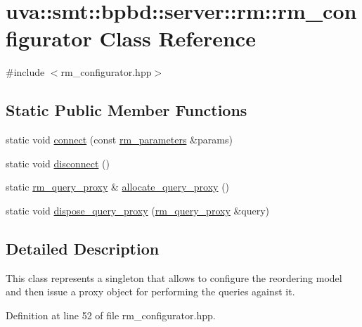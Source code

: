 \hypertarget{classuva_1_1smt_1_1bpbd_1_1server_1_1rm_1_1rm__configurator}{}\section{uva\+:\+:smt\+:\+:bpbd\+:\+:server\+:\+:rm\+:\+:rm\+\_\+configurator Class Reference}
\label{classuva_1_1smt_1_1bpbd_1_1server_1_1rm_1_1rm__configurator}


{\ttfamily \#include $<$rm\+\_\+configurator.\+hpp$>$}

\subsection*{Static Public Member Functions}
\begin{DoxyCompactItemize}
\item 
static void \hyperlink{classuva_1_1smt_1_1bpbd_1_1server_1_1rm_1_1rm__configurator_a3a84c4b261236e443aabf9a8b0f5f621}{connect} (const \hyperlink{structuva_1_1smt_1_1bpbd_1_1server_1_1rm_1_1rm__parameters}{rm\+\_\+parameters} \&params)
\item 
static void \hyperlink{classuva_1_1smt_1_1bpbd_1_1server_1_1rm_1_1rm__configurator_a9a79034392793abee6ed714d38f414cc}{disconnect} ()
\item 
static \hyperlink{classuva_1_1smt_1_1bpbd_1_1server_1_1rm_1_1proxy_1_1rm__query__proxy}{rm\+\_\+query\+\_\+proxy} \& \hyperlink{classuva_1_1smt_1_1bpbd_1_1server_1_1rm_1_1rm__configurator_a78c4e9f2e5b56104839a66ebc9058803}{allocate\+\_\+query\+\_\+proxy} ()
\item 
static void \hyperlink{classuva_1_1smt_1_1bpbd_1_1server_1_1rm_1_1rm__configurator_a74a43377bf78423d0271560b074b95fc}{dispose\+\_\+query\+\_\+proxy} (\hyperlink{classuva_1_1smt_1_1bpbd_1_1server_1_1rm_1_1proxy_1_1rm__query__proxy}{rm\+\_\+query\+\_\+proxy} \&query)
\end{DoxyCompactItemize}


\subsection{Detailed Description}
This class represents a singleton that allows to configure the reordering model and then issue a proxy object for performing the queries against it. 

Definition at line 52 of file rm\+\_\+configurator.\+hpp.



